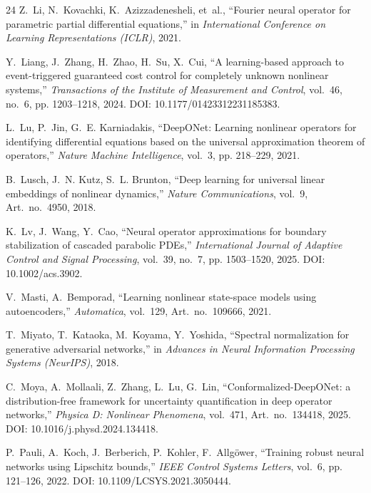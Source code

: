 \documentclass[11pt]{article}
\begin{document}
\begin{thebibliography}{24}
Z.~Li, N.~Kovachki, K.~Azizzadenesheli, et~al.,
``Fourier neural operator for parametric partial differential equations,''
in \emph{International Conference on Learning Representations (ICLR)}, 2021.

Y.~Liang, J.~Zhang, H.~Zhao, H.~Su, X.~Cui,
``A learning-based approach to event-triggered guaranteed cost control
for completely unknown nonlinear systems,''
\emph{Transactions of the Institute of Measurement and Control},
vol.~46, no.~6, pp. 1203--1218, 2024. DOI: 10.1177/01423312231185383.

L.~Lu, P.~Jin, G.~E. Karniadakis,
``DeepONet: Learning nonlinear operators for identifying differential
equations based on the universal approximation theorem of operators,''
\emph{Nature Machine Intelligence}, vol.~3, pp. 218--229, 2021.

B.~Lusch, J.~N. Kutz, S.~L. Brunton,
``Deep learning for universal linear embeddings of nonlinear dynamics,''
\emph{Nature Communications}, vol.~9, Art.\ no.\ 4950, 2018.

K.~Lv, J.~Wang, Y.~Cao,
``Neural operator approximations for boundary stabilization of cascaded
parabolic PDEs,''
\emph{International Journal of Adaptive Control and Signal Processing},
vol.~39, no.~7, pp. 1503--1520, 2025. DOI: 10.1002/acs.3902.

V.~Masti, A.~Bemporad,
``Learning nonlinear state-space models using autoencoders,''
\emph{Automatica}, vol.~129, Art.\ no.\ 109666, 2021.

T.~Miyato, T.~Kataoka, M.~Koyama, Y.~Yoshida,
``Spectral normalization for generative adversarial networks,''
in \emph{Advances in Neural Information Processing Systems (NeurIPS)}, 2018.

C.~Moya, A.~Mollaali, Z.~Zhang, L.~Lu, G.~Lin,
``Conformalized-DeepONet: a distribution-free framework for uncertainty
quantification in deep operator networks,''
\emph{Physica D: Nonlinear Phenomena}, vol.~471, Art.\ no.\ 134418, 2025.
DOI: 10.1016/j.physd.2024.134418.

P.~Pauli, A.~Koch, J.~Berberich, P.~Kohler, F.~Allg{\"o}wer,
``Training robust neural networks using Lipschitz bounds,''
\emph{IEEE Control Systems Letters}, vol.~6, pp. 121--126, 2022.
DOI: 10.1109/LCSYS.2021.3050444.


\end{thebibliography}
\end{document}
